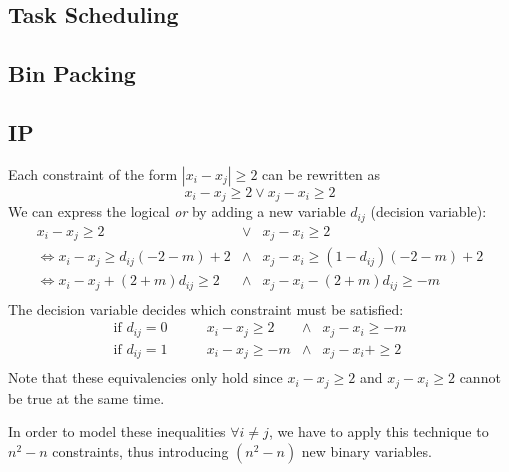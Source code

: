 \documentclass[a4paper, oneside]{scrartcl}
\begin{document}
\subsection{Task Scheduling}

\subsection{Bin Packing}

\subsection{IP}

Each constraint of the form $|x_i - x_j| \geq 2$ can be rewritten as
\[x_i - x_j \geq 2 \vee x_j - x_i \geq 2\]
We can express the logical \emph{or} by adding a 
new variable $d_{ij}$ (decision variable):
\[ \begin{array} {ccc}
x_i-x_j \geq 2 & \vee & x_j-x_i \geq 2 \\
\Leftrightarrow x_i - x_j \geq d_{ij}(-2-m) +2 &\wedge& x_j - x_i \geq (1-d_{ij})(-2-m) +2 \\
\Leftrightarrow x_i - x_j + (2+m)d_{ij} \geq 2 &\wedge& x_j - x_i - (2+m)d_{ij}\geq  -m \\
\end{array} \]
The decision variable decides which constraint must be satisfied: 
\[ \begin{array} {cccc}
\text{if } d_{ij} = 0 \qquad & x_i - x_j \geq 2 &\wedge& x_j - x_i \geq -m \\
\text{if } d_{ij} = 1 \qquad & x_i - x_j \geq -m &\wedge& x_j - x_i + \geq  2 \\
\end{array} \]
Note that these equivalencies only hold since $x_i-x_j \geq 2$ and $x_j-x_i \geq 2$ cannot be true at the same time.

In order to model these inequalities $\forall i\neq j$, we have to apply this technique to $n^2  -n$ constraints, 
thus introducing $(n^2-n)$ new binary variables.
\end{document}
